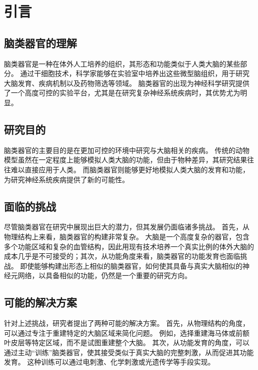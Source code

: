 \chapter{引言}\label{chap:introduction}

\section{脑类器官的理解}\label{sec:brain-organoid}
脑类器官是一种在体外人工培养的组织，其形态和功能类似于人类大脑的某些部分\cite{Kim2023}。
通过干细胞技术，科学家能够在实验室中培养出这些微型脑组织，用于研究大脑发育、疾病机制以及药物筛选等领域。
脑类器官的出现为神经科学研究提供了一个高度可控的实验平台，尤其是在研究复杂神经系统疾病时，其优势尤为明显。


\section{研究目的}\label{sec:research-purpose}
脑类器官的主要目的是在更加可控的环境中研究与大脑相关的疾病。
传统的动物模型虽然在一定程度上能够模拟人类大脑的功能，但由于物种差异，其研究结果往往难以直接应用于人类。
而脑类器官则能够更好地模拟人类大脑的发育和功能，为研究神经系统疾病提供了新的可能性。


\section{面临的挑战}\label{sec:research-challenges}
尽管脑类器官在研究中展现出巨大的潜力，但其发展仍面临诸多挑战。
首先，从物理结构上来看，脑类器官的构建非常复杂。
大脑是一个高度复杂的器官，包含多个功能区域和复杂的血管结构，因此用现有技术培养一个真实比例的体外大脑的成本几乎是不可接受的；其次，从功能角度来看，脑类器官的功能发育也面临挑战。
即使能够构建出形态上相似的脑类器官，如何使其具备与真实大脑相似的神经元网络，以具备相似的功能，仍然是一个重要的研究方向。


\section{可能的解决方案}\label{sec:research-solutions}
针对上述挑战，研究者提出了两种可能的解决方案。
首先，从物理结构的角度，可以通过专注于重建特定的大脑区域来简化问题。
例如，选择重建海马体或前额叶皮层等特定区域，而不是试图重建整个大脑。
其次，从功能发育的角度，可以通过主动“训练”脑类器官，使其接受类似于真实大脑的完整刺激，从而促进其功能发育。
这种训练可以通过电刺激、化学刺激或光遗传学等手段实现。


